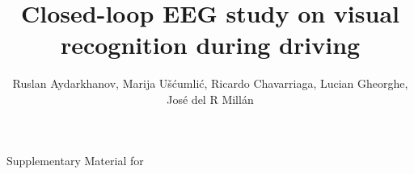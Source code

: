 \documentclass[12pt]{iopart}
\begin{document}
{\centering \Large
Supplementary Material for \\
}
\title[]{Closed-loop EEG study on visual recognition during driving}

\author{Ruslan Aydarkhanov,
Marija U\v{s}\'{c}umli\'{c},
Ricardo Chavarriaga,
Lucian Gheorghe,
Jos\'e del R Mill\'an}





\vspace{10pt}

\end{document}
